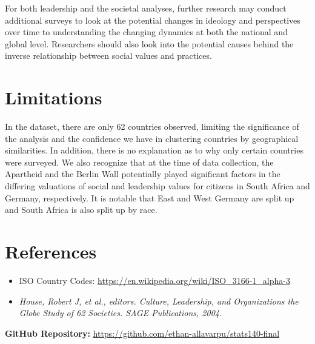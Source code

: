 \documentclass[
]{article}
\providecommand{\tightlist}{%
  \setlength{\itemsep}{0pt}\setlength{\parskip}{0pt}}
\begin{document}
For both leadership and the societal analyses, further research may
conduct additional surveys to look at the potential changes in ideology
and perspectives over time to understanding the changing dynamics at
both the national and global level. Researchers should also look into
the potential causes behind the inverse relationship between social
values and practices.

\hypertarget{limitations}{%
\section{Limitations}\label{limitations}}

In the dataset, there are only 62 countries observed, limiting the
significance of the analysis and the confidence we have in clustering
countries by geographical similarities. In addition, there is no
explanation as to why only certain countries were surveyed. We also
recognize that at the time of data collection, the Apartheid and the
Berlin Wall potentially played significant factors in the differing
valuations of social and leadership values for citizens in South Africa
and Germany, respectively. It is notable that East and West Germany are
split up and South Africa is also split up by race.

\hypertarget{references}{%
\section{References}\label{references}}

\begin{itemize}
\tightlist
\item
  ISO Country Codes:
  \url{https://en.wikipedia.org/wiki/ISO_3166-1_alpha-3}
\item
  \emph{House, Robert J, et al., editors. Culture, Leadership, and Organizations the Globe Study of 62 Societies. SAGE Publications, 2004.}
\end{itemize}

\vfill

\textbf{GitHub Repository:}
\url{https://github.com/ethan-allavarpu/stats140-final}
\end{document}
